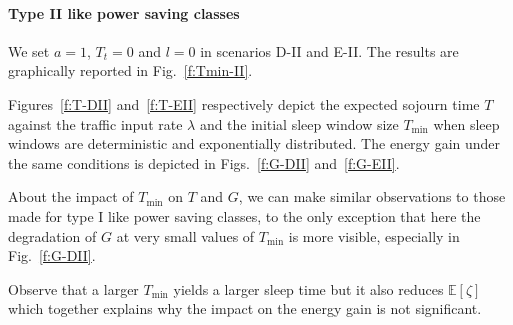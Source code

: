\documentclass[journal]{IEEEtran}
\def \E{{\mathbb E}}
\begin{document}
\paragraph{Type II like power saving classes}
We set $a=1$, $T_t=0$ and $l=0$ in scenarios D-II and E-II. The results are graphically
reported in Fig.~\ref{f:Tmin-II}.
\begin{figure*}[tb]
\begin{center}
\caption{Impact of $T_{\min}$ on $T$ and $G$ in type II like power saving classes.
\label{f:Tmin-II}}
\end{center}
\end{figure*}
Figures~\ref{f:T-DII} and~\ref{f:T-EII} respectively depict the expected sojourn time $T$ against the traffic input rate $\lambda$ and the initial sleep window size $T_{\min}$ when sleep windows are
deterministic and exponentially distributed. The energy gain under the same conditions is depicted in Figs.~\ref{f:G-DII} and~\ref{f:G-EII}.

About the impact of $T_{\min}$ on $T$ and $G$, we can make similar observations to those made for type I like power saving classes, to the only exception that here the degradation of $G$ at very small values of $T_{\min}$ is more visible, especially in Fig.~\ref{f:G-DII}. 

Observe that a larger $T_{\min}$ yields a larger sleep time but it also reduces $\E[\zeta]$ which together explains why the impact on the energy gain is not significant.
\end{document}
